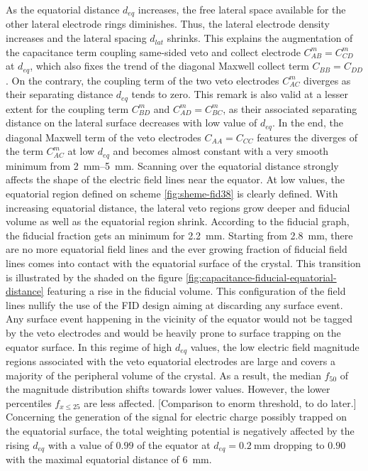 As the equatorial distance $d_{eq}$ increases, the free lateral space available for the other lateral electrode rings diminishes. Thus, the lateral electrode density increases and the lateral spacing $d_{lat}$ shrinks. 
This explains the augmentation of the capacitance term coupling same-sided veto and collect electrode $C_{AB}^m=C_{CD}^m$ at $d_{eq}$, which also fixes the trend of the diagonal Maxwell collect term $C_{BB}=C_{DD}$. On the contrary, the coupling term of the two veto electrodes $C_{AC}^m$ diverges as their separating distance $d_{eq}$ tends to zero. This remark is also valid at a lesser extent for the coupling term $C_{BD}^m$ and $C_{AD}^m = C_{BC}^m$,  as their associated separating distance on the lateral surface decreases with low value of $d_{eq}$. In the end, the diagonal Maxwell term of the veto electrodes $C_{AA} = C_{CC}$ features the diverges of the term $C_{AC}^m$ at low $d_{eq}$ and becomes almost constant with a very smooth minimum from \SIrange{2}{5}{\mm}.
Scanning over the equatorial distance strongly affects the shape of the electric field lines near the equator. At low values, the equatorial region defined on scheme \ref{fig:sheme-fid38} is clearly defined. With increasing equatorial distance, the lateral veto regions grow deeper and fiducial volume as well as the equatorial region shrink. According to the fiducial graph, the fiducial fraction gets an minimum for \SI{2.2}{\mm}. Starting from \SI{2.8}{\mm}, there are no more equatorial field lines and the ever growing fraction of fiducial field lines comes into contact with the equatorial surface of the crystal. This transition is illustrated by the shaded on the figure \ref{fig:capacitance-fiducial-equatorial-distance} featuring a rise in the fiducial volume. This configuration of the field lines nullify the use of the FID design aiming at discarding any surface event. Any surface event happening in the vicinity of the equator would not be tagged by the veto electrodes and would be heavily prone to surface trapping on the equator surface.
In this regime of high $d_{eq}$ values, the low electric field magnitude regions associated with the veto equatorial electrodes are large and covers a majority of the peripheral volume of the crystal. As a result, the median $f_{50}$ of the magnitude distribution shifts towards lower values. However, the lower percentiles $f_{x \leq 25}$ are less affected.
{\color{red} [Comparison to enorm threshold, to do later.]}
Concerning the generation of the signal for electric charge possibly trapped on the equatorial surface, the total weighting potential is negatively affected by the rising $d_{eq}$ with a value of $0.99$ of the equator at $d_{eq}=\SI{0.2}{\mm}$ dropping to $0.90$ with the maximal equatorial distance of \SI{6}{\mm}.

